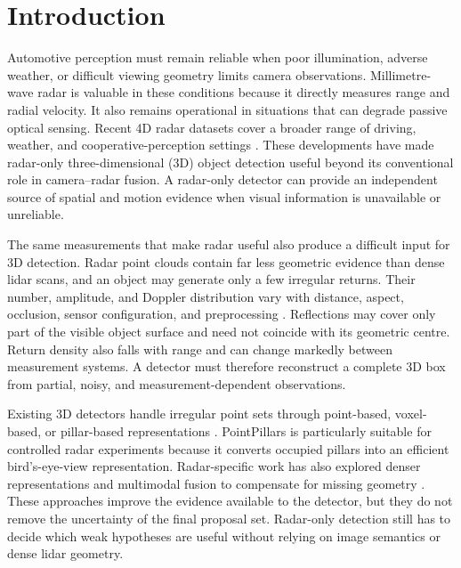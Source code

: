\documentclass[sensors,article,submit,pdftex,moreauthors]{Definitions/mdpi}
\begin{document}
\section{Introduction}

Automotive perception must remain reliable when poor illumination, adverse
weather, or difficult viewing geometry limits camera observations.
Millimetre-wave radar is valuable in these conditions because it directly
measures range and radial velocity. It also remains operational in situations
that can degrade passive optical sensing. Recent 4D radar datasets cover a
broader range of driving, weather, and cooperative-perception settings
\cite{paek2022kradar,yang2024v2xradar}. These developments have made radar-only
three-dimensional (3D) object detection useful beyond its conventional role in
camera--radar fusion. A radar-only detector can provide an independent source
of spatial and motion evidence when visual information is unavailable or
unreliable.

The same measurements that make radar useful also produce a difficult input
for 3D detection. Radar point clouds contain far less geometric evidence than
dense lidar scans, and an object may generate only a few irregular returns.
Their number, amplitude, and Doppler distribution vary with distance, aspect,
occlusion, sensor configuration, and preprocessing
\cite{kong2025rtnhplus,song2026radarrepresentations}. Reflections may cover only
part of the visible object surface and need not coincide with its geometric
centre. Return density also falls with range and can change markedly between
measurement systems. A detector must therefore reconstruct a complete 3D box
from partial, noisy, and measurement-dependent observations.

Existing 3D detectors handle irregular point sets through point-based,
voxel-based, or pillar-based representations
\cite{qi2017pointnet,qi2017pointnetpp,zhou2018voxelnet,yan2018second,
lang2019pointpillars}. PointPillars is particularly suitable for controlled
radar experiments because it converts occupied pillars into an efficient
bird's-eye-view representation. Radar-specific work has also explored denser
representations and multimodal fusion to compensate for missing geometry
\cite{wang2021rodnet,nabati2021centerfusion,montiel2024pointcloudpainting}.
These approaches improve the evidence available to the detector, but they do
not remove the uncertainty of the final proposal set. Radar-only detection
still has to decide which weak hypotheses are useful without relying on image
semantics or dense lidar geometry.
\end{document}
